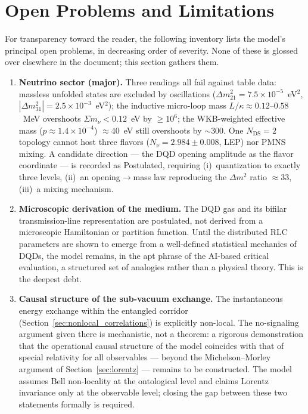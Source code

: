\documentclass[11pt,a4paper]{article}
\theoremstyle{plain}
\theoremstyle{remark}
\newcommand{\Ncd}{\ensuremath{N_{\mathrm{DS}}}}
\begin{document}
\section{Open Problems and Limitations}
\label{sec:open_problems}
For transparency toward the reader, the following inventory lists the model's principal open problems, in decreasing order of severity. None of these is glossed over elsewhere in the document; this section gathers them.

\begin{enumerate}
    \item \textbf{Neutrino sector (major).} Three readings all fail against table data: massless unfolded states are excluded by oscillations ($\Delta m^2_{21} = 7.5\times10^{-5}$~eV$^2$, $|\Delta m^2_{31}| = 2.5\times10^{-3}$~eV$^2$); the inductive micro-loop mass $L/\kappa \approx 0.12$--$0.58$~MeV overshoots $\Sigma m_\nu < 0.12$~eV by $\ge 10^{6}$; the WKB-weighted effective mass ($p \approx 1.4\times10^{-4}$) $\approx 40$~eV still overshoots by $\sim$300. One $\Ncd=2$ topology cannot host three flavors ($N_\nu = 2.984 \pm 0.008$, LEP) nor PMNS mixing. A candidate direction --- the DQD opening amplitude as the flavor coordinate --- is recorded as Postulated, requiring (i)~quantization to exactly three levels, (ii)~an opening$\to$mass law reproducing the $\Delta m^2$ ratio $\approx 33$, (iii)~a mixing mechanism.
    \item \textbf{Microscopic derivation of the medium.} The DQD gas and its bifilar transmission-line representation are postulated, not derived from a microscopic Hamiltonian or partition function. Until the distributed RLC parameters are shown to emerge from a well-defined statistical mechanics of DQDs, the model remains, in the apt phrase of the AI-based critical evaluation, a structured set of analogies rather than a physical theory. This is the deepest debt.
    \item \textbf{Causal structure of the sub-vacuum exchange.} The instantaneous energy exchange within the entangled corridor (Section~\ref{sec:nonlocal_correlations}) is explicitly non-local. The no-signaling argument given there is mechanistic, not a theorem: a rigorous demonstration that the operational causal structure of the model coincides with that of special relativity for all observables --- beyond the Michelson--Morley argument of Section~\ref{sec:lorentz} --- remains to be constructed. The model assumes Bell non-locality at the ontological level and claims Lorentz invariance only at the observable level; closing the gap between these two statements formally is required.

\end{enumerate}
\end{document}
